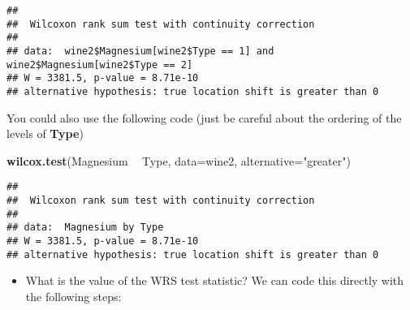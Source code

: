 \documentclass[]{book}
\newenvironment{Shaded}{\begin{snugshade}}{\end{snugshade}}
\newcommand{\DataTypeTok}[1]{\textcolor[rgb]{0.13,0.29,0.53}{#1}}
\newcommand{\DecValTok}[1]{\textcolor[rgb]{0.00,0.00,0.81}{#1}}
\newcommand{\KeywordTok}[1]{\textcolor[rgb]{0.13,0.29,0.53}{\textbf{#1}}}
\newcommand{\NormalTok}[1]{#1}
\newcommand{\OperatorTok}[1]{\textcolor[rgb]{0.81,0.36,0.00}{\textbf{#1}}}
\newcommand{\StringTok}[1]{\textcolor[rgb]{0.31,0.60,0.02}{#1}}
\providecommand{\tightlist}{%
  \setlength{\itemsep}{0pt}\setlength{\parskip}{0pt}}
\begin{document}
\begin{Shaded}
\end{Shaded}

\begin{verbatim}
## 
##  Wilcoxon rank sum test with continuity correction
## 
## data:  wine2$Magnesium[wine2$Type == 1] and wine2$Magnesium[wine2$Type == 2]
## W = 3381.5, p-value = 8.71e-10
## alternative hypothesis: true location shift is greater than 0
\end{verbatim}

You could also use the following code (just be careful about the ordering of the levels of \textbf{Type})

\begin{Shaded}
\begin{Highlighting}[]
\KeywordTok{wilcox.test}\NormalTok{(Magnesium }\OperatorTok{~}\StringTok{ }\NormalTok{Type, }\DataTypeTok{data=}\NormalTok{wine2, }\DataTypeTok{alternative=}\StringTok{"greater"}\NormalTok{)}
\end{Highlighting}
\end{Shaded}

\begin{verbatim}
## 
##  Wilcoxon rank sum test with continuity correction
## 
## data:  Magnesium by Type
## W = 3381.5, p-value = 8.71e-10
## alternative hypothesis: true location shift is greater than 0
\end{verbatim}

\begin{itemize}
\tightlist
\item
  What is the value of the WRS test statistic? We can code this directly
  with the following steps:
\end{itemize}
\end{document}

